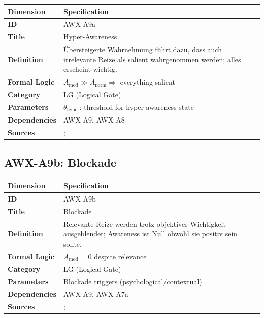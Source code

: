 \begin{table}[htbp]
\small
\begin{tabular}{p{3cm}p{11cm}}
\toprule
\textbf{Dimension} & \textbf{Specification} \\
\midrule
\textbf{ID} & AWX-A9a \\
\textbf{Title} & Hyper-Awareness \\
\textbf{Definition} & Übersteigerte Wahrnehmung führt dazu, dass auch irrelevante Reize als salient wahrgenommen werden; alles erscheint wichtig. \\
\textbf{Formal Logic} & $A_{\text{mod}} \gg A_{\text{norm}} \Rightarrow$ everything salient \\
\textbf{Category} & LG (Logical Gate) \\
\textbf{Parameters} & $\theta_{\text{hyper}}$: threshold for hyper-awareness state \\
\textbf{Dependencies} & AWX-A9, AWX-A8 \\
\textbf{Sources} & \citet{loewenstein2001risk}; \citet{rottenstreich2001money} \\
\bottomrule
\end{tabular}
\end{table}


\subsection{AWX-A9b: Blockade}

\begin{table}[htbp]
\small
\begin{tabular}{p{3cm}p{11cm}}
\toprule
\textbf{Dimension} & \textbf{Specification} \\
\midrule
\textbf{ID} & AWX-A9b \\
\textbf{Title} & Blockade \\
\textbf{Definition} & Relevante Reize werden trotz objektiver Wichtigkeit ausgeblendet; Awareness ist Null obwohl sie positiv sein sollte. \\
\textbf{Formal Logic} & $A_{\text{mod}} = 0$ despite relevance \\
\textbf{Category} & LG (Logical Gate) \\
\textbf{Parameters} & Blockade triggers (psychological/contextual) \\
\textbf{Dependencies} & AWX-A9, AWX-A7a \\
\textbf{Sources} & \citet{benartzi2004save}; \citet{choi2004optimal} \\
\bottomrule
\end{tabular}
\end{table}

